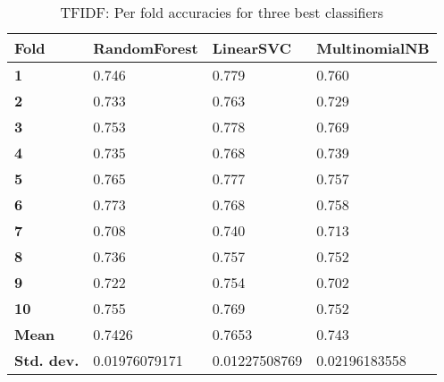 \documentclass{article}
\begin{document}
\begin{table}[h]
\begin{tabular}{llll}
\textbf{Fold}      & \textbf{RandomForest} & \textbf{LinearSVC} & \textbf{MultinomialNB} \\ \hline
\textbf{1}         & 0.746                 & 0.779              & 0.760                  \\
\textbf{2}         & 0.733                 & 0.763              & 0.729                  \\
\textbf{3}         & 0.753                 & 0.778              & 0.769                  \\
\textbf{4}         & 0.735                 & 0.768              & 0.739                  \\
\textbf{5}         & 0.765                 & 0.777              & 0.757                  \\
\textbf{6}         & 0.773                 & 0.768              & 0.758                  \\
\textbf{7}         & 0.708                 & 0.740              & 0.713                  \\
\textbf{8}         & 0.736                 & 0.757              & 0.752                  \\
\textbf{9}         & 0.722                 & 0.754              & 0.702                  \\
\textbf{10}        & 0.755                 & 0.769              & 0.752                  \\ \hline
\textbf{Mean}      & 0.7426                & 0.7653             & 0.743                  \\ \hline
\textbf{Std. dev.} & 0.01976079171         & 0.01227508769      & 0.02196183558       
\end{tabular}
\caption {TFIDF: Per fold accuracies for three best classifiers}
\end{table}
\end{document}

